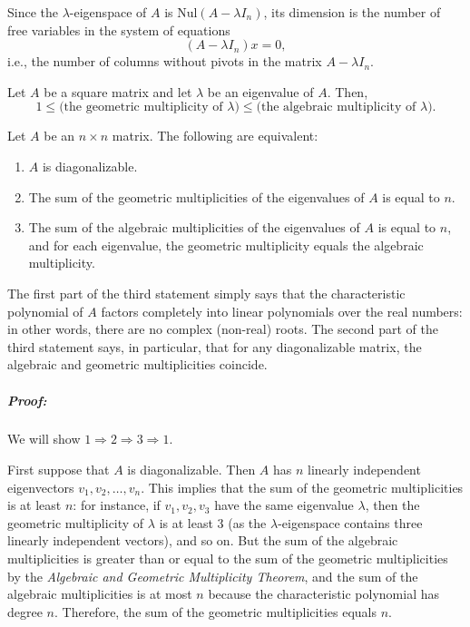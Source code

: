 \documentclass[a4paper,12pt]{article}
\begin{document}
Since the \( \lambda \)-eigenspace of \( A \) is \( \text{Nul}(A - \lambda I_n) \), its dimension is the number of free variables in the system of equations 
\[
(A - \lambda I_n) x = 0,
\]
i.e., the number of columns without pivots in the matrix \( A - \lambda I_n \).
\begin{tcolorbox}[title=Theorem (Algebraic and Geometric Multiplicity):,colframe=blue!70!black, colback=blue!5!white]
Let \( A \) be a square matrix and let \( \lambda \) be an eigenvalue of \( A \). Then,
\[
1 \leq \text{(the geometric multiplicity of } \lambda \text{)} \leq \text{(the algebraic multiplicity of } \lambda \text{)}.
\]
\end{tcolorbox}

\begin{tcolorbox}[title=Diagonalization Theorem-Variant,colframe=blue!70!black, colback=blue!5!white]
Let \( A \) be an \( n \times n \) matrix. The following are equivalent:
\begin{enumerate}
    \item \( A \) is diagonalizable.
    \item The sum of the geometric multiplicities of the eigenvalues of \( A \) is equal to \( n \).
    \item The sum of the algebraic multiplicities of the eigenvalues of \( A \) is equal to \( n \), and for each eigenvalue, the geometric multiplicity equals the algebraic multiplicity.
\end{enumerate}

\end{tcolorbox}

The first part of the third statement simply says that the characteristic polynomial of \( A \) factors completely into linear polynomials over the real numbers: in other words, there are no complex (non-real) roots. The second part of the third statement says, in particular, that for any diagonalizable matrix, the algebraic and geometric multiplicities coincide.

\subparagraph{Proof:}We will show \( 1 \Rightarrow 2 \Rightarrow 3 \Rightarrow 1 \).

First suppose that \( A \) is diagonalizable. Then \( A \) has \( n \) linearly independent eigenvectors \( v_1, v_2, \dots, v_n \). This implies that the sum of the geometric multiplicities is at least \( n \): for instance, if \( v_1, v_2, v_3 \) have the same eigenvalue \( \lambda \), then the geometric multiplicity of \( \lambda \) is at least 3 (as the \( \lambda \)-eigenspace contains three linearly independent vectors), and so on. But the sum of the algebraic multiplicities is greater than or equal to the sum of the geometric multiplicities by the \textit{Algebraic and Geometric Multiplicity Theorem}, and the sum of the algebraic multiplicities is at most \( n \) because the characteristic polynomial has degree \( n \). Therefore, the sum of the geometric multiplicities equals \( n \).
\end{document}
